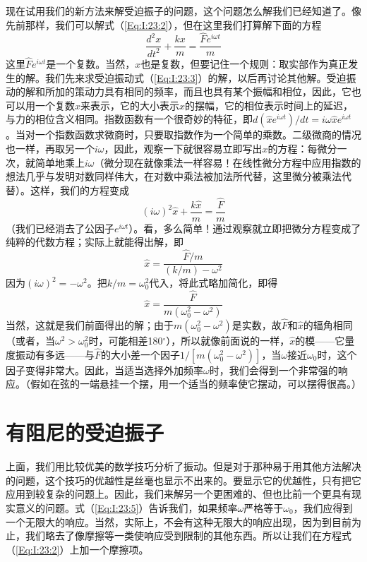现在试用我们的新方法来解受迫振子的问题，这个问题怎么解我们已经知道了。像先前那样，我们可以解式（\ref{Eq:I:23:2}），但在这里我们打算解下面的方程
\begin{equation}
    \label{Eq:I:23:3}
    \frac{d^2x}{dt^2} + \frac{kx}{m} = \frac{\hat{F}e^{i\omega t}}{m}
\end{equation}
这里$\hat{F}e^{i\omega t}$是一个复数。当然，$x$也是复数，但要记住一个规则：取实部作为真正发生的解。我们先来求受迫振动式（\ref{Eq:I:23:3}）的解，以后再讨论其他解。受迫振动的解和所加的策动力具有相同的频率，而且也具有某个振幅和相位，因此，它也可以用一个复数$\hat{x}$来表示，它的大小表示$x$的摆幅，它的相位表示时间上的延迟，与力的相位含义相同。指数函数有一个很奇妙的特征，即$d(\hat{x}e^{i\omega t})/dt=i\omega\hat{x}e^{i\omega t}$。当对一个指数函数求微商时，只要取指数作为一个简单的乘数。二级微商的情况也一样，再取另一个$i\omega$，因此，观察一下就很容易立即写出$x$的方程：每微分一次，就简单地乘上$i\omega$（微分现在就像乘法一样容易！在线性微分方程中应用指数的想法几乎与发明对数同样伟大，在对数中乘法被加法所代替，这里微分被乘法代替）。这样，我们的方程变成
\begin{equation}
    \label{Eq:I:23:4}
    (i\omega)^2\hat{x} + \frac{k\hat{x}}{m} = \frac{\hat{F}}{m}
\end{equation}
（我们已经消去了公因子$e^{i\omega t}$）。看，多么简单！通过观察就立即把微分方程变成了纯粹的代数方程；实际上就能得出解，即
\begin{equation*}
    \hat{x} = \frac{\hat{F}/m}{(k/m)-\omega^2}
\end{equation*}
因为$(i\omega)^2=-\omega^2$。把$k/m=\omega_0^2$代入，将此式略加简化，即得
\begin{equation}
    \label{Eq:I:23:5}
    \hat{x} = \frac{\hat{F}}{m(\omega_0^2 - \omega^2)}
\end{equation}
当然，这就是我们前面得出的解；由于$m(\omega_0^2 -\omega^2)$是实数，故$\hat{F}$和$\hat{x}$的辐角相同（或者，当$\omega^2>\omega_0^2$时，可能相差180$^\circ$），所以就像前面说的一样，$\hat{x}$的模——它量度振动有多远——与$\hat{F}$的大小差一个因子$1/[m(\omega_0^2 - \omega^2)]$，当$\omega$接近$\omega_0$时，这个因子变得非常大。因此，当适当选择外加频率$\omega$时，我们会得到一个非常强的响应。（假如在弦的一端悬挂一个摆，用一个适当的频率使它摆动，可以摆得很高。）

\section{有阻尼的受迫振子}

上面，我们用比较优美的数学技巧分析了振动。但是对于那种易于用其他方法解决的问题，这个技巧的优越性是丝毫也显示不出来的。要显示它的优越性，只有把它应用到较复杂的问题上。因此，我们来解另一个更困难的、但也比前一个更具有现实意义的问题。式（\ref{Eq:I:23:5}）告诉我们，如果频率$\omega$严格等于$\omega_0$，我们应得到一个无限大的响应。当然，实际上，不会有这种无限大的响应出现，因为到目前为止，我们略去了像摩擦等一类使响应受到限制的其他东西。所以让我们在方程式（\ref{Eq:I:23:2}）上加一个摩擦项。

